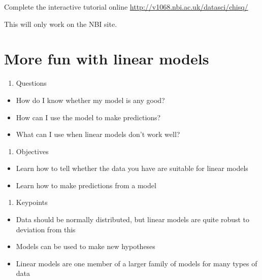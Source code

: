 \documentclass[
]{book}
\providecommand{\tightlist}{%
  \setlength{\itemsep}{0pt}\setlength{\parskip}{0pt}}
\newenvironment{task}
{ \begin{tcolorbox}[title=For you to do,title filled] }
{  \end{tcolorbox} }
\begin{document}
\begin{task}
Complete the interactive tutorial online \url{http://v1068.nbi.ac.uk/datasci/chisq/}

This will only work on the NBI site.
\end{task}

\hypertarget{more-fun-with-linear-models}{%
\chapter{More fun with linear models}\label{more-fun-with-linear-models}}

\begin{enumerate}
\def\labelenumi{\arabic{enumi}.}
\tightlist
\item
  Questions
\end{enumerate}

\begin{itemize}
\tightlist
\item
  How do I know whether my model is any good?
\item
  How can I use the model to make predictions?
\item
  What can I use when linear models don't work well?
\end{itemize}

\begin{enumerate}
\def\labelenumi{\arabic{enumi}.}
\setcounter{enumi}{1}
\tightlist
\item
  Objectives
\end{enumerate}

\begin{itemize}
\tightlist
\item
  Learn how to tell whether the data you have are suitable for linear models
\item
  Learn how to make predictions from a model
\end{itemize}

\begin{enumerate}
\def\labelenumi{\arabic{enumi}.}
\setcounter{enumi}{2}
\tightlist
\item
  Keypoints
\end{enumerate}

\begin{itemize}
\tightlist
\item
  Data should be normally distributed, but linear models are quite robust to deviation from this
\item
  Models can be used to make new hypotheses
\item
  Linear models are one member of a larger family of models for many types of data
\end{itemize}
\end{document}
